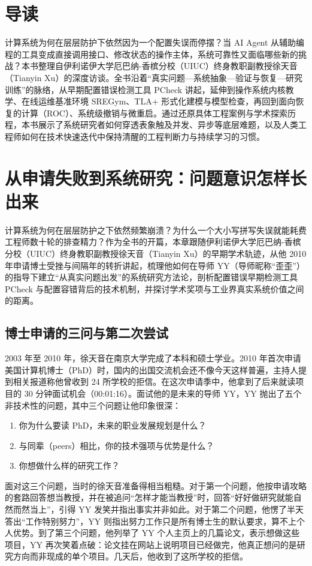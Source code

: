 \documentclass[UTF8,a4paper,11pt,fontset=fandol]{ctexart}
\begin{document}
\section*{导读}
计算系统为何在层层防护下依然因为一个配置失误而停摆？当 AI Agent 从辅助编程的工具变成直接调用接口、修改状态的操作主体，系统可靠性又面临哪些新的挑战？本书整理自伊利诺伊大学厄巴纳-香槟分校（UIUC）终身教职副教授徐天音（Tianyin Xu）的深度访谈。全书沿着“真实问题—系统抽象—验证与恢复—研究训练”的脉络，从早期配置错误检测工具 PCheck 讲起，延伸到操作系统内核教学、在线运维基准环境 SREGym、TLA+ 形式化建模与模型检查，再回到面向恢复的计算（ROC）、系统级撤销与微重启。通过还原具体工程案例与学术探索历程，本书展示了系统研究者如何穿透表象触及并发、异步等底层难题，以及人类工程师如何在技术快速迭代中保持清醒的工程判断力与持续学习的习惯。
\section{从申请失败到系统研究：问题意识怎样长出来}
计算系统为何在层层防护之下依然频繁崩溃？为什么一个大小写拼写失误就能耗费工程师数十轮的排查精力？作为全书的开篇，本章跟随伊利诺伊大学厄巴纳-香槟分校（UIUC）终身教职副教授徐天音（Tianyin Xu）的早期学术轨迹，从他 2010 年申请博士受挫与间隔年的转折讲起，梳理他如何在导师 YY（导师昵称“歪歪”）的指导下建立“从真实问题出发”的系统研究方法论，剖析配置错误早期检测工具 PCheck 与配置容错背后的技术机制，并探讨学术奖项与工业界真实系统价值之间的距离。
\subsection{博士申请的三问与第二次尝试}
2003 年至 2010 年，徐天音在南京大学完成了本科和硕士学业。2010 年首次申请美国计算机博士（PhD）时，国内的出国交流机会还不像今天这样普遍，主持人提到相关报道称他曾收到 24 所学校的拒信。在这次申请季中，他拿到了后来就读项目的 30 分钟面试机会（00:01:16）。面试他的是未来的导师 YY，YY 抛出了五个非技术性的问题，其中三个问题让他印象很深：
\begin{enumerate}
\item 你为什么要读 PhD，未来的职业发展规划是什么？
\item 与同辈（peers）相比，你的技术强项与优势是什么？
\item 你想做什么样的研究工作？
\end{enumerate}

面对这三个问题，当时的徐天音准备得相当粗糙。对于第一个问题，他按申请攻略的套路回答想当教授，并在被追问“怎样才能当教授”时，回答“好好做研究就能自然而然当上”，引得 YY 发笑并指出事实并非如此。对于第二个问题，他愣了半天答出“工作特别努力”，YY 则指出努力工作只是所有博士生的默认要求，算不上个人优势。到了第三个问题，他列举了 YY 个人主页上的几篇论文，表示想做这些项目，YY 再次笑着点破：论文挂在网站上说明项目已经做完，他真正想问的是研究方向而非现成的单个项目。几天后，他收到了这所学校的拒信。
\end{document}

